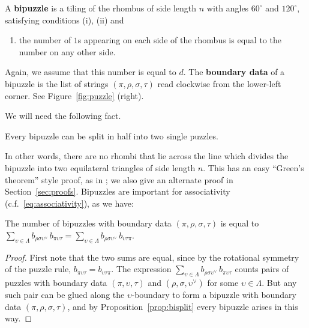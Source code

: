 A {\bf bipuzzle} is a tiling of the rhombus of side length
$n$ with angles $60^\circ$ and $120^\circ$, satisfying conditions
(i), (ii) and
\begin{enumerate}
\item[(iii)] the number of $1$s appearing on each side of the rhombus 
is equal to the number on any other side.
\end{enumerate}
Again, we assume that this number is equal to $d$.  
The {\bf boundary data} of a bipuzzle is the list of strings
$(\pi, \rho, \sigma, \tau)$ read clockwise from the lower-left
corner.  See Figure~\ref{fig:puzzle} (right).

We will need the following fact.
\begin{proposition}
\label{prop:bisplit}
Every bipuzzle can be split in half into two single puzzles.
\end{proposition}

In other words, there are no rhombi that lie across the line which 
divides the bipuzzle into two equilateral triangles of side length
$n$.  This has an easy ``Green's theorem'' style proof, as in 
\cite[Lemma 5]{knutson-tao:equiv}; we also give an alternate
proof in Section~\ref{sec:proofs}.  Bipuzzles are important for 
associativity (c.f.~\eqref{eq:associativity}), as we have:

\begin{proposition}
\label{prop:countbipuzzles}
The number of bipuzzles with boundary data 
$(\pi, \rho, \sigma, \tau)$ is equal to
$\sum_{\upsilon \in \Lambda} b_{\rho \sigma \upsilon^\vee} \,
b_{\pi \upsilon \tau} =
\sum_{\upsilon \in \Lambda} b_{\rho \sigma \upsilon^\vee} \,
b_{\upsilon \tau \pi}$.
\end{proposition}

\begin{proof}  First note that the two sums are equal,
since by the rotational symmetry of the puzzle rule,
$b_{\pi \upsilon \tau} = b_{\upsilon \tau \pi}$.  
The expression 
$\sum_{\upsilon \in \Lambda} b_{\rho \sigma \upsilon^\vee} \,
b_{\pi \upsilon \tau}$ counts pairs of puzzles
 with boundary data $(\pi, \upsilon, \tau)$ and 
$(\rho, \sigma, \upsilon^\vee)$ for some $\upsilon \in \Lambda$.
But any such pair can be glued along the
$\upsilon$-boundary to form a bipuzzle with boundary
data $(\pi, \rho, \sigma, \tau)$, and by 
Proposition~\ref{prop:bisplit} every bipuzzle arises 
in this way.  
\end{proof}

